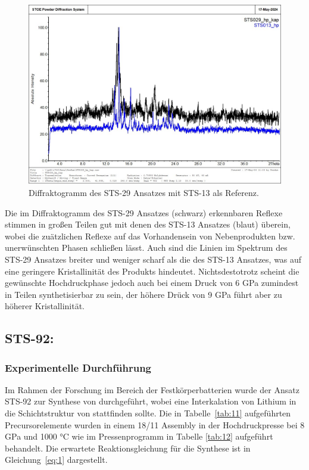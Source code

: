 \documentclass[12pt]{article}
\begin{document}
\begin{figure}[H]
    \centering
    \includegraphics[height=8cm]{Images/STS029_hp.jpg}
    \caption{Diffraktogramm des STS-29 Ansatzes mit STS-13 als Referenz.}
    \label{fig:8}
\end{figure}

\noindent Die im Diffraktogramm des STS-29 Ansatzes (schwarz) erkennbaren Reflexe stimmen in großen Teilen gut mit denen des STS-13 Ansatzes (blaut) überein, wobei die zuätzlichen Reflexe auf das Vorhandensein von Nebenprodukten bzw. unerwünschten Phasen schließen lässt. 
Auch sind die Linien im Spektrum des STS-29 Ansatzes breiter und weniger scharf als die des STS-13 Ansatzes, was auf eine geringere Kristallinität des Produkts hindeutet.
Nichtsdestotrotz scheint die gewünschte Hochdruckphase jedoch auch bei einem Druck von 6 GPa zumindest in Teilen synthetisierbar zu sein, der höhere Drück von 9 GPa führt aber zu höherer Kristallinität.

\subsection{STS-92: }
\subsubsection{Experimentelle Durchführung}

Im Rahmen der Forschung im Bereich der Festkörperbatterien wurde der Ansatz STS-92 zur Synthese von  durchgeführt, wobei eine Interkalation von Lithium in die Schichtstruktur von  stattfinden sollte.
Die in Tabelle~\ref{tab:11} aufgeführten Precursorelemente wurden in einem 18/11 Assembly in der Hochdruckpresse bei 8 GPa und 1000 \si{\degreeCelsius} wie im Pressenprogramm in Tabelle \ref{tab:12} aufgeführt behandelt. Die erwartete Reaktionsgleichung für die Synthese ist in Gleichung~\ref{eq:1} dargestellt.
\end{document}
